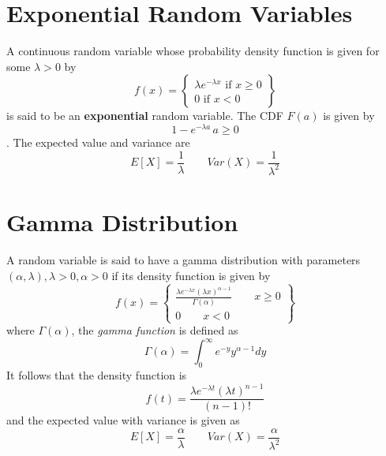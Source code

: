\section{Exponential Random Variables}
\begin{definition}
    A continuous random variable whose probability density function is given for some $\lambda > 0$ by
    \begin{equation*}
        f(x) =
        \left\{
            \begin{array}{lr}
                \lambda e^{-\lambda x} \text{ if } x\geq 0\\
                0 \text{ if } x < 0
            \end{array}
        \right\}
    \end{equation*}
    is said to be an \textbf{exponential} random variable. The CDF $F(a)$ is given by \[1- e^{-\lambda a}\, a\geq 0\]. The expected value and variance are \[E[X] = \frac{1}{\lambda}\qquad Var(X) = \frac{1}{\lambda^2}\]
\end{definition}
\section{Gamma Distribution}
A random variable is said to have a gamma distribution with parameters $(\alpha, \lambda), \lambda > 0, \alpha > 0$ if its density function is given by 
\begin{equation*}
    f(x) =
    \left\{
        \begin{array}{lr}
            \frac{\lambda e^{-\lambda x}(\lambda x)^{\alpha -1}}{\Gamma(\alpha)}\qquad x\geq 0\\
            0 \qquad x < 0
        \end{array}
    \right\}
\end{equation*}
where $\Gamma (\alpha)$, the \textit{gamma function} is defined as \[\Gamma(\alpha) = \int^\infty_0 e^{-y}y^{\alpha-1} dy\]
It follows that the density function is \[f(t) = \frac{\lambda e^{-\lambda t}(\lambda t)^{n-1}}{(n-1)!}\] and the expected value with variance is given as \[E[X] = \frac{\alpha}{\lambda}\qquad Var(X) = \frac{\alpha}{\lambda^2}\]

